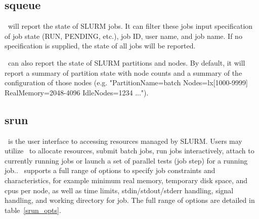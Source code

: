 \subsection{squeue}

\squeue\ will report the state of SLURM jobs.  It can filter these
jobs input specification of job state (RUN, PENDING, etc.), job ID,
user name, and job name.  If no specification is supplied, the state of
all jobs will be reported.

\squeue\ can also report the state of SLURM partitions and nodes.  By
default, it will report a summary of partition state with node counts and
a summary of the configuration of those nodes (e.g.  "PartitionName=batch
Nodes=lx[1000-9999] RealMemory=2048-4096 IdleNodes=1234 ...").

\subsection{srun}

\srun\ is the user interface to accessing resources managed by SLURM.
Users may utilize \srun\ to allocate resources, submit batch jobs, 
run jobs interactively, attach to currently running jobs or launch 
a set of parallel tests (job step) for a running job.. \srun\ 
supports a full range of options to specify job constraints and
characteristics, for example minimum real memory, temporary disk space,
and cpus per node, as well as time limits, stdin/stdout/stderr 
handling, signal handling, and working directory for job.
The full range of options are detailed in table~\ref{srun_opts}.

